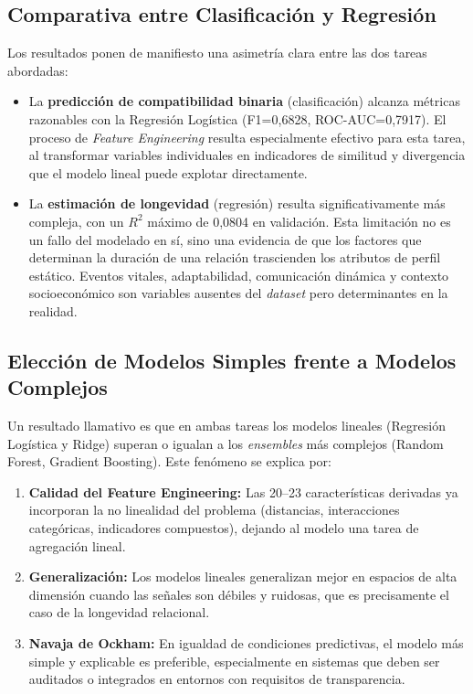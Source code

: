 \subsection{Comparativa entre Clasificación y Regresión}

Los resultados ponen de manifiesto una asimetría clara entre las dos tareas abordadas:

\begin{itemize}
    \item La \textbf{predicción de compatibilidad binaria} (clasificación) alcanza métricas razonables con la Regresión Logística (F1=0,6828, ROC-AUC=0,7917). El proceso de \textit{Feature Engineering} resulta especialmente efectivo para esta tarea, al transformar variables individuales en indicadores de similitud y divergencia que el modelo lineal puede explotar directamente.

    \item La \textbf{estimación de longevidad} (regresión) resulta significativamente más compleja, con un $R^2$ máximo de 0,0804 en validación. Esta limitación no es un fallo del modelado en sí, sino una evidencia de que los factores que determinan la duración de una relación trascienden los atributos de perfil estático. Eventos vitales, adaptabilidad, comunicación dinámica y contexto socioeconómico son variables ausentes del \textit{dataset} pero determinantes en la realidad.
\end{itemize}

\subsection{Elección de Modelos Simples frente a Modelos Complejos}

Un resultado llamativo es que en ambas tareas los modelos lineales (Regresión Logística y Ridge) superan o igualan a los \textit{ensembles} más complejos (Random Forest, Gradient Boosting). Este fenómeno se explica por:

\begin{enumerate}
    \item \textbf{Calidad del Feature Engineering:} Las 20--23 características derivadas ya incorporan la no linealidad del problema (distancias, interacciones categóricas, indicadores compuestos), dejando al modelo una tarea de agregación lineal.
    \item \textbf{Generalización:} Los modelos lineales generalizan mejor en espacios de alta dimensión cuando las señales son débiles y ruidosas, que es precisamente el caso de la longevidad relacional.
    \item \textbf{Navaja de Ockham:} En igualdad de condiciones predictivas, el modelo más simple y explicable es preferible, especialmente en sistemas que deben ser auditados o integrados en entornos con requisitos de transparencia.
\end{enumerate}


